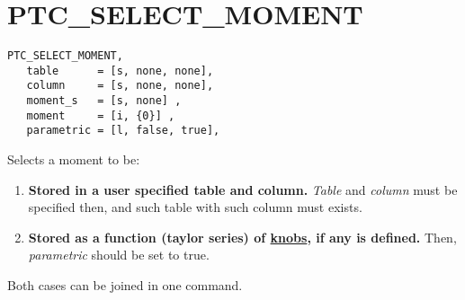 
\section{PTC\_SELECT\_MOMENT}

\begin{verbatim}
PTC_SELECT_MOMENT, 
   table      = [s, none, none], 
   column     = [s, none, none], 
   moment_s   = [s, none] , 
   moment     = [i, {0}] , 
   parametric = [l, false, true], 
\end{verbatim}

Selects a moment to be: 
\begin{enumerate}
  \item {\bf Stored in a user specified table and column.}
    \textit{Table} and \textit{column} must be specified then, and such
    table with such column must exists.  

  \item {\bf Stored as a function (taylor series) of
    \href{PTC_Knob.html}{knobs}, if any is defined.} Then,
    \textit{parametric} should be set to true. 
\end{enumerate}
Both cases can be joined in one command.   


